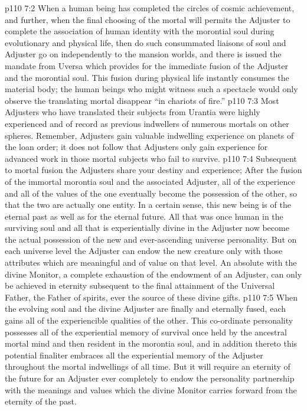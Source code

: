 \vs p110 7:2 When a human being has completed the circles of cosmic achievement, and further, when the final choosing of the mortal will permits the Adjuster to complete the association of human identity with the morontial soul during evolutionary and physical life, then do such consummated liaisons of soul and Adjuster go on independently to the mansion worlds, and there is issued the mandate from Uversa which provides for the immediate fusion of the Adjuster and the morontial soul. This fusion during physical life instantly consumes the material body; the human beings who might witness such a spectacle would only observe the translating mortal disappear “in chariots of fire.”
\vs p110 7:3 Most Adjusters who have translated their subjects from Urantia were highly experienced and of record as previous indwellers of numerous mortals on other spheres. Remember, Adjusters gain valuable indwelling experience on planets of the loan order; it does not follow that Adjusters only gain experience for advanced work in those mortal subjects who fail to survive.
\pc \vs p110 7:4 Subsequent to mortal fusion the Adjusters share your destiny and experience;  After the fusion of the immortal morontia soul and the associated Adjuster, all of the experience and all of the values of the one eventually become the possession of the other, so that the two are actually one entity. In a certain sense, this new being is of the eternal past as well as for the eternal future. All that was once human in the surviving soul and all that is experientially divine in the Adjuster now become the actual possession of the new and ever\hyp{}ascending universe personality. But on each universe level the Adjuster can endow the new creature only with those attributes which are meaningful and of value on that level. An absolute  with the divine Monitor, a complete exhaustion of the endowment of an Adjuster, can only be achieved in eternity subsequent to the final attainment of the Universal Father, the Father of spirits, ever the source of these divine gifts.
\vs p110 7:5 When the evolving soul and the divine Adjuster are finally and eternally fused, each gains all of the experiencible qualities of the other. This co\hyp{}ordinate personality possesses all of the experiential memory of survival once held by the ancestral mortal mind and then resident in the morontia soul, and in addition thereto this potential finaliter embraces all the experiential memory of the Adjuster throughout the mortal indwellings of all time. But it will require an eternity of the future for an Adjuster ever completely to endow the personality partnership with the meanings and values which the divine Monitor carries forward from the eternity of the past.
